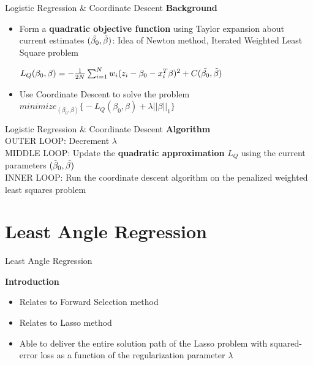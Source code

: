 \documentclass[handout]{beamer}
\begin{document}
\begin{frame}{Logistic Regression \& Coordinate Descent}
\textbf{Background}
\vspace*{3mm}
\begin{itemize}
    \item Form a \textbf{quadratic objective function} using Taylor expansion about current estimates \((\Tilde{\beta_0},\Tilde{\beta})\): Idea of Newton method, Iterated Weighted Least Square problem  
\vspace*{3mm}
    
\(L_Q(\beta_0,\beta)=-\frac{1}{2N}\sum_{i=1}^{N}w_i(z_i-\beta_0-x_i^T\beta)^2+C(\Tilde{\beta_0},\Tilde{\beta})\) 

\vspace*{3mm}

\item Use Coordinate Descent to solve the problem  \\ 
\vspace*{2mm}
\(minimize_{(\beta_0 , \beta)} \big\{ -L_Q (\beta_0,\beta)+\lambda \lvert \lvert \beta \lvert\lvert_{1} \big\} \)

\end{itemize}
\end{frame}

\begin{frame}{Logistic Regression \& Coordinate Descent}
\textbf{Algorithm}\\
\vspace*{3mm}
OUTER LOOP: Decrement $\lambda$ \\
\vspace*{3mm}
MIDDLE LOOP: Update the \textbf{quadratic approximation} $L_{Q}$ using the current parameters \(\Tilde{(\beta_0},\Tilde{\beta)}\)\\
\vspace*{3mm}
INNER LOOP: Run the coordinate descent algorithm on the penalized weighted least squares problem


\end{frame}
\section{Least Angle Regression}
\begin{frame}{Least Angle Regression}

\textbf{Introduction}
\vspace*{3mm}
\begin{itemize}
    \item Relates to Forward Selection method
    \vspace*{3mm}
    \item Relates to Lasso method 
     \vspace*{3mm}
    \item Able to deliver the entire solution path of the Lasso problem with squared-error loss as a function of the regularization parameter $\lambda$
\end{itemize}
\end{frame}
\end{document}
